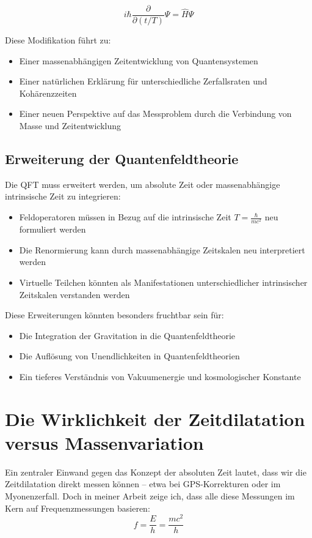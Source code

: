 \documentclass[a4paper,12pt]{article}
\begin{document}
	\begin{equation}
		i\hbar \frac{\partial}{\partial (t/T)} \Psi = \hat{H} \Psi
	\end{equation}
	
	Diese Modifikation führt zu:
	\begin{itemize}
		\item Einer massenabhängigen Zeitentwicklung von Quantensystemen
		\item Einer natürlichen Erklärung für unterschiedliche Zerfallsraten und Kohärenzzeiten
		\item Einer neuen Perspektive auf das Messproblem durch die Verbindung von Masse und Zeitentwicklung
	\end{itemize}
	
	\subsection{Erweiterung der Quantenfeldtheorie}
	
	Die QFT muss erweitert werden, um absolute Zeit oder massenabhängige intrinsische Zeit zu integrieren:
	
	\begin{itemize}
		\item Feldoperatoren müssen in Bezug auf die intrinsische Zeit $T = \frac{\hbar}{mc^2}$ neu formuliert werden
		\item Die Renormierung kann durch massenabhängige Zeitskalen neu interpretiert werden
		\item Virtuelle Teilchen könnten als Manifestationen unterschiedlicher intrinsischer Zeitskalen verstanden werden
	\end{itemize}
	
	Diese Erweiterungen könnten besonders fruchtbar sein für:
	\begin{itemize}
		\item Die Integration der Gravitation in die Quantenfeldtheorie
		\item Die Auflösung von Unendlichkeiten in Quantenfeldtheorien
		\item Ein tieferes Verständnis von Vakuumenergie und kosmologischer Konstante
	\end{itemize}
	
	\section{Die Wirklichkeit der Zeitdilatation versus Massenvariation}
	
	Ein zentraler Einwand gegen das Konzept der absoluten Zeit lautet, dass wir die Zeitdilatation direkt messen können -- etwa bei GPS-Korrekturen oder im Myonenzerfall. Doch in meiner Arbeit zeige ich, dass alle diese Messungen im Kern auf Frequenzmessungen basieren:
	\begin{equation}
		f = \frac{E}{h} = \frac{mc^2}{h}
	\end{equation}
	
\end{document}
